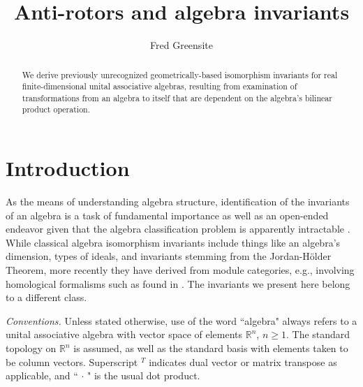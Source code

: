 \documentclass{amsart}
\theoremstyle{definition}
\numberwithin{theorem}{section}
\numberwithin{equation}{section}
\begin{document}
 

    
    \title{Anti-rotors and algebra invariants}
    
       \author{Fred Greensite}
 
       \begin{abstract} We derive previously unrecognized geometrically-based isomorphism invariants for real finite-dimensional unital associative algebras, resulting from examination of transformations from an algebra to itself that are dependent on the algebra's bilinear product operation.  
   \end{abstract}
   
    \maketitle
    

\thispagestyle{empty}
\section{Introduction}
As the means of understanding algebra structure, identification of the invariants of an algebra is a task of fundamental importance as well as an open-ended endeavor given that the algebra classification problem is apparently intractable \cite{eom:2024,belitskii:2005}.  While classical algebra isomorphism invariants include things like an algebra's dimension, types of ideals, and invariants stemming from the Jordan-H\"older Theorem, more recently they have derived from module categories, e.g., involving homological formalisms such as found in \cite{hochschild:1945,gerstenhaber:1964,loday:1998}.  The invariants we present here belong to a different class.  

\bigskip

{\it Conventions.} Unless stated otherwise, use of the word ``algebra" always refers to a unital associative algebra with vector space of elements $\mathbb{R}^n$, $n\ge 1$.  The standard topology on $\mathbb{R}^n$ is assumed, as well as the standard basis with elements taken to be column vectors.  Superscript $^T$ indicates dual vector or matrix transpose as applicable, and ``$\,\cdot\,$" is the usual dot product.  
\end{document}
